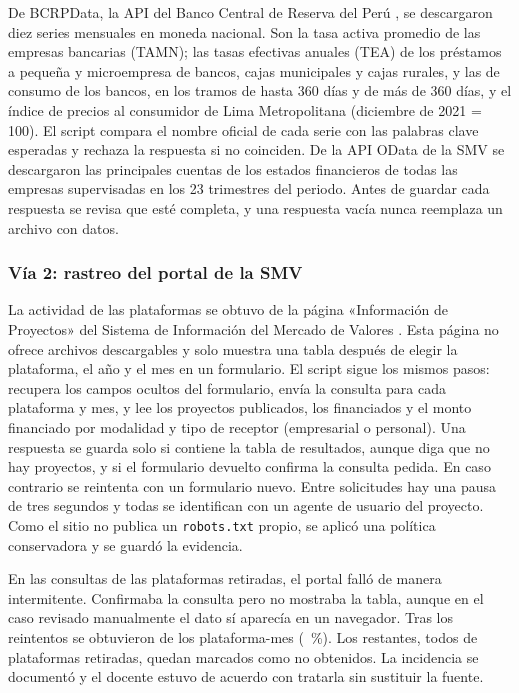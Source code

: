 De BCRPData, la API del Banco Central de Reserva del Perú \parencite{bcrpdata2026}, se descargaron diez series mensuales en moneda nacional. Son la tasa activa promedio de las empresas bancarias (TAMN); las tasas efectivas anuales (TEA) de los préstamos a pequeña y microempresa de bancos, cajas municipales y cajas rurales, y las de consumo de los bancos, en los tramos de hasta 360 días y de más de 360 días, y el índice de precios al consumidor de Lima Metropolitana (diciembre de 2021 = 100). El script compara el nombre oficial de cada serie con las palabras clave esperadas y rechaza la respuesta si no coinciden. De la API OData de la SMV \parencite{smvodata2026} se descargaron las principales cuentas de los estados financieros de todas las empresas supervisadas en los 23 trimestres del periodo. Antes de guardar cada respuesta se revisa que esté completa, y una respuesta vacía nunca reemplaza un archivo con datos.

\subsubsection{Vía 2: rastreo del portal de la SMV}

La actividad de las plataformas se obtuvo de la página «Información de Proyectos» del Sistema de Información del Mercado de Valores \parencite{smvsimv2026}. Esta página no ofrece archivos descargables y solo muestra una tabla después de elegir la plataforma, el año y el mes en un formulario. El script sigue los mismos pasos: recupera los campos ocultos del formulario, envía la consulta para cada plataforma y mes, y lee los proyectos publicados, los financiados y el monto financiado por modalidad y tipo de receptor (empresarial o personal). Una respuesta se guarda solo si contiene la tabla de resultados, aunque diga que no hay proyectos, y si el formulario devuelto confirma la consulta pedida. En caso contrario se reintenta con un formulario nuevo. Entre solicitudes hay una pausa de tres segundos y todas se identifican con un agente de usuario del proyecto. Como el sitio no publica un \texttt{robots.txt} propio, se aplicó una política conservadora y se guardó la evidencia.

En las consultas de las plataformas retiradas, el portal falló de manera intermitente. Confirmaba la consulta pero no mostraba la tabla, aunque en el caso revisado manualmente el dato sí aparecía en un navegador. Tras los reintentos se obtuvieron  de los  plataforma-mes (~\%). Los  restantes, todos de plataformas retiradas, quedan marcados como no obtenidos. La incidencia se documentó y el docente estuvo de acuerdo con tratarla sin sustituir la fuente.

